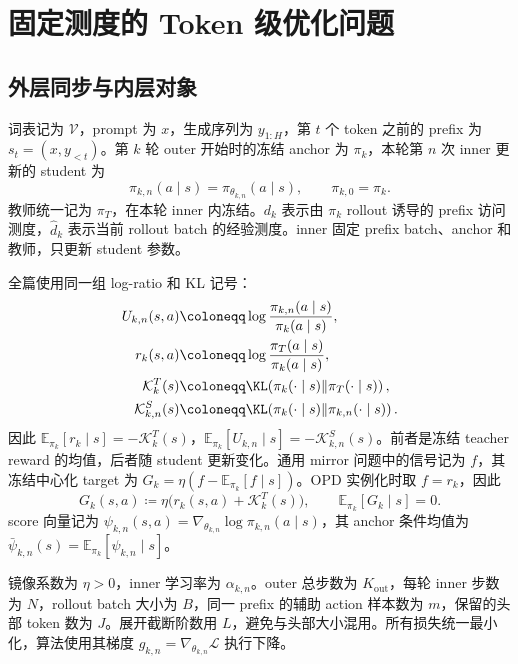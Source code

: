 \chapter{固定测度的 Token 级优化问题}

\section{外层同步与内层对象}

词表记为 $\mathcal V$，prompt 为 $x$，生成序列为 $y_{1:H}$，第 $t$ 个 token 之前的 prefix 为 $s_t=(x,y_{<t})$。第 $k$ 轮 outer 开始时的冻结 anchor 为 $\pi_k$，本轮第 $n$ 次 inner 更新的 student 为
\begin{equation}
\pi_{k,n}(a\mid s)=\pi_{\theta_{k,n}}(a\mid s),
\qquad \pi_{k,0}=\pi_k.
\end{equation}
教师统一记为 $\pi_T$，在本轮 inner 内冻结。$d_k$ 表示由 $\pi_k$ rollout 诱导的 prefix 访问测度，$\widehat d_k$ 表示当前 rollout batch 的经验测度。inner 固定 prefix batch、anchor 和教师，只更新 student 参数。



全篇使用同一组 log-ratio 和 KL 记号：
\begin{align}
U_{k,n}(s,a)&\coloneqq\log\frac{\pi_{k,n}(a\mid s)}{\pi_k(a\mid s)},\\
r_k(s,a)&\coloneqq\log\frac{\pi_T(a\mid s)}{\pi_k(a\mid s)},\\
\mathcal K_k^T(s)&\coloneqq\KL\!\left(\pi_k(\cdot\mid s)\Vert\pi_T(\cdot\mid s)\right),\\
\mathcal K_{k,n}^S(s)&\coloneqq\KL\!\left(\pi_k(\cdot\mid s)\Vert\pi_{k,n}(\cdot\mid s)\right).
\end{align}
因此 $\mathbb E_{\pi_k}[r_k\mid s]=-\mathcal K_k^T(s)$，$\mathbb E_{\pi_k}[U_{k,n}\mid s]=-\mathcal K_{k,n}^S(s)$。前者是冻结 teacher reward 的均值，后者随 student 更新变化。通用 mirror 问题中的信号记为 $f$，其冻结中心化 target 为 $G_k=\eta(f-\mathbb E_{\pi_k}[f\mid s])$。OPD 实例化时取 $f=r_k$，因此
\begin{equation}
G_k(s,a)\coloneqq\eta\bigl(r_k(s,a)+\mathcal K_k^T(s)\bigr),
\qquad\mathbb E_{\pi_k}[G_k\mid s]=0.
\end{equation}
score 向量记为 $\psi_{k,n}(s,a)=\nabla_{\theta_{k,n}}\log\pi_{k,n}(a\mid s)$，其 anchor 条件均值为 $\bar\psi_{k,n}(s)=\mathbb E_{\pi_k}[\psi_{k,n}\mid s]$。

镜像系数为 $\eta>0$，inner 学习率为 $\alpha_{k,n}$。outer 总步数为 $K_{\mathrm{out}}$，每轮 inner 步数为 $N$，rollout batch 大小为 $B$，同一 prefix 的辅助 action 样本数为 $m$，保留的头部 token 数为 $J$。展开截断阶数用 $L$，避免与头部大小混用。所有损失统一最小化，算法使用其梯度 $g_{k,n}=\nabla_{\theta_{k,n}}\mathcal L$ 执行下降。

